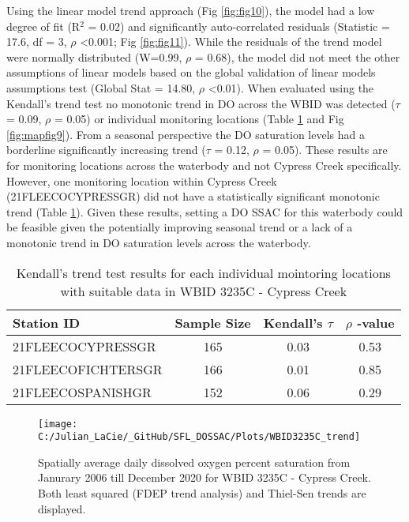 \documentclass[]{interact}
\theoremstyle{plain}%
\theoremstyle{definition}
\theoremstyle{remark}
\begin{document}
Using the linear model trend approach (Fig \ref{fig:fig10}), the model
had a low degree of fit (R\(^{2}\) = 0.02) and significantly
auto-correlated residuals (Statistic = 17.6, df = 3, \(\rho\)
\textless0.001; Fig \ref{fig:fig11}). While the residuals of the trend
model were normally distributed (W=0.99, \(\rho\) = 0.68), the model did
not meet the other assumptions of linear models based on the global
validation of linear models assumptions test (Global Stat = 14.80,
\(\rho\) \textless0.01). When evaluated using the Kendall's trend test
no monotonic trend in DO across the WBID was detected (\(\tau\) = 0.09,
\(\rho\) = 0.05) or individual monitoring locations (Table
\ref{tab:trendtab9} and Fig \ref{fig:mapfig9}). From a seasonal
perspective the DO saturation levels had a borderline significantly
increasing trend (\(\tau\) = 0.12, \(\rho\) = 0.05). These results are
for monitoring locations across the waterbody and not Cypress Creek
specifically. However, one monitoring location within Cypress Creek
(21FLEECOCYPRESSGR) did not have a statistically significant monotonic
trend (Table \ref{tab:trendtab9}). Given these results, setting a DO
SSAC for this waterbody could be feasible given the potentially
improving seasonal trend or a lack of a monotonic trend in DO saturation
levels across the waterbody.

\begin{table}[H]

\caption{\label{tab:unnamed-chunk-17}\label{tab:trendtab9} Kendall's trend test results for each individual mointoring locations with suitable data in WBID 3235C - Cypress Creek}
\centering
\fontsize{10}{12}\selectfont
\begin{tabular}[t]{lccc}
\toprule
Station ID & Sample Size & Kendall's $\tau$ & $\rho$ -value\\
\midrule
21FLEECOCYPRESSGR & 165 & 0.03 & 0.53\\
21FLEECOFICHTERSGR & 166 & 0.01 & 0.85\\
21FLEECOSPANISHGR & 152 & 0.06 & 0.29\\
\bottomrule
\end{tabular}
\end{table}

\begin{figure}[H]

{\centering \texttt{[image: C:/Julian\_LaCie/\_GitHub/SFL\_DOSSAC/Plots/WBID3235C\_trend]} 

}

\caption{\label{fig:fig10} Spatially average daily dissolved oxygen percent saturation from Janurary 2006 till December 2020 for  WBID 3235C - Cypress Creek. Both least squared (FDEP trend analysis) and Thiel-Sen trends are displayed.}\label{fig:unnamed-chunk-18}
\end{figure}
\end{document}
